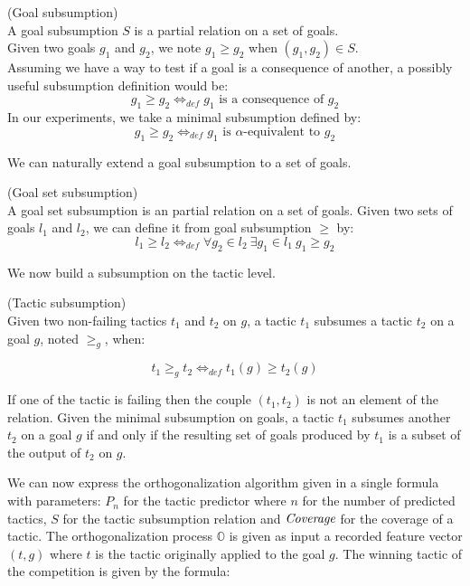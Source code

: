 \documentclass[runningheads,a4paper,draft]{svjour3}
\begin{document}
\begin{definition} (Goal subsumption)\\ 
A goal subsumption $S$ is a partial relation on a set of goals.\\
Given two goals $g_1$ and $g_2$, we note $g_1 \ge g_2$ when  $(g_1,g_2) \in 
S$.\\
Assuming we have a way to test if a goal is a consequence of another, a 
possibly useful subsumption definition would be: 
\[g_1 \ge g_2  \Leftrightarrow_{def} g_1 \mbox{ is a consequence of } g_2\]
In our experiments, we take a minimal subsumption defined by:
\[g_1 \ge g_2  \Leftrightarrow_{def} g_1 \mbox{ is $\alpha$-equivalent to }  
 g_2\]
\end{definition}

We can naturally extend a goal subsumption to a set of goals.
\begin{definition} (Goal set subsumption)\\
A goal set subsumption is an partial relation on a set of goals.
Given two sets of goals $l_1$ and $l_2$, we can define it from goal 
subsumption $\ge$ by:
\[l_1 \ge l_2  \Leftrightarrow_{def} \forall g_2 \in l_2\ \exists g_1 \in l_1\ 
g_1 \ge g_2\]
\end{definition}


We now build a subsumption on the tactic level.
\begin{definition} (Tactic subsumption)\\  
Given two non-failing tactics $t_1$ and $t_2$ on $g$, a tactic $t_1$ subsumes a 
tactic $t_2$ on a goal $g$, noted $\ge_g$, when:

 \[t_1 \ge_g t_2 \Leftrightarrow_{def} t_1(g) \ge t_2(g)\]

If one of the tactic is failing then the couple $(t_1,t_2)$ is not an element 
of the 
relation.
Given the minimal subsumption on goals, a tactic $t_1$ subsumes another $t_2$ 
on a goal 
$g$ if and only if the resulting set of goals produced by $t_1$ is a subset 
of the output of $t_2$ on $g$. 
\end{definition}

We can now express the orthogonalization algorithm given in a single formula 
with parameters: $P_n$ for the tactic predictor where $n$ for the number of 
predicted
tactics, $S$ for the tactic subsumption relation and $\textit{\mbox{Coverage}}$ 
for the coverage of 
a tactic. The orthogonalization process $\mathbb{O}$ is given as input a 
recorded feature vector $(t,g)$ where $t$ is the tactic originally applied to 
the goal $g$. The winning tactic of the competition is given by the formula:
\end{document}

